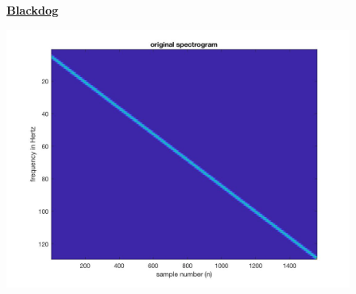\documentclass{article}
\begin{document}
\begin{figure}[H]
  \color{red}
  \underline{\textbf{Blackdog}}
  \color{black}

\includegraphics[scale=.5]{Blackdog1}
\end{figure}
\end{document}
